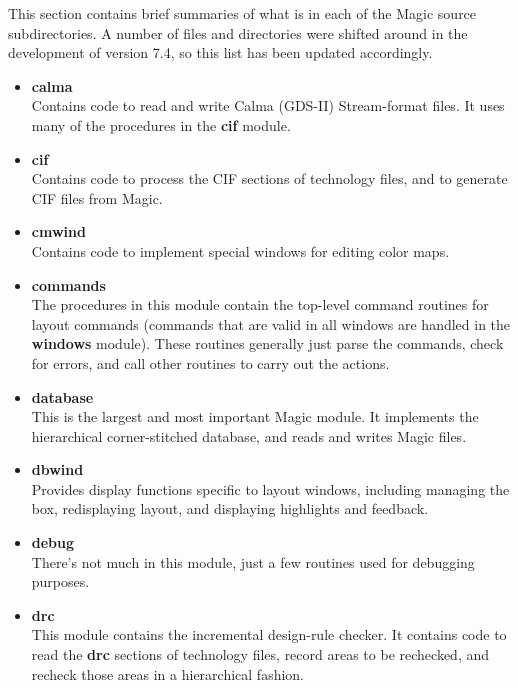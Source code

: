 \documentclass[letterpaper,twoside,12pt]{article}
\begin{document}
This section contains brief summaries of what is in each of the Magic
source subdirectories.  A number of files and directories were shifted
around in the development of version 7.4, so this list has been
updated accordingly.

\begin{itemize}
\item {\bfseries calma}  \\
Contains code to read and write Calma (GDS-II) Stream-format files.  It
uses many of the procedures in the {\bfseries cif} module.

\item {\bfseries cif}  \\
Contains code to process the CIF sections of technology
files, and to generate CIF files from Magic.

\item {\bfseries cmwind}  \\
Contains code to implement special windows for editing color maps.

\item {\bfseries commands}  \\
The procedures in this module contain the top-level command
routines for layout commands (commands that are
valid in all windows are handled in the {\bfseries windows} module).
These routines generally just parse the commands, check for
errors, and call other routines to carry out the actions.

\item {\bfseries database}  \\
This is the largest and most important Magic module.  It
implements the hierarchical corner-stitched database, and
reads and writes Magic files.

\item {\bfseries dbwind}  \\
Provides display functions specific to layout windows, including managing
the box, redisplaying layout, and displaying highlights and feedback.

\item {\bfseries debug}  \\
There's not much in this module, just a few routines used for
debugging purposes.

\item {\bfseries drc}  \\
This module contains the incremental design-rule checker.  It
contains code to read the {\bfseries drc} sections of technology files,
record areas to be rechecked, and recheck those areas in
a hierarchical fashion.  


\end{itemize}
\end{document}
